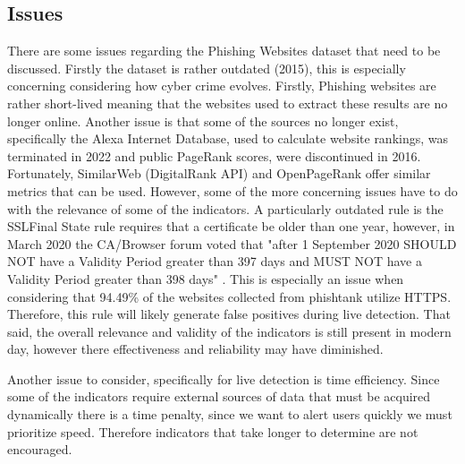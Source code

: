 \documentclass{sigkddExp}
\begin{document}
\subsection{Issues}
There are some issues regarding the Phishing Websites dataset that need to be discussed. Firstly the dataset is rather outdated (2015), this is especially concerning considering how cyber crime evolves. Firstly, Phishing websites are rather short-lived meaning that the websites used to extract these results are no longer online. Another issue is that some of the sources no longer exist, specifically the Alexa Internet Database, used to calculate website rankings, was terminated in 2022 and public PageRank scores, were discontinued in 2016. Fortunately, SimilarWeb (DigitalRank API) and OpenPageRank offer similar metrics that can be used. However, some of the more concerning issues have to do with the relevance of some of the indicators. A particularly outdated rule is the SSLFinal State rule requires that a certificate be older than one year, however, in March 2020 the CA/Browser forum voted that "after 1 September 2020 SHOULD NOT have a Validity Period greater than 397 days and MUST NOT have a Validity Period greater than 398 days" \cite{cabforum2020}. This is especially an issue when considering that 94.49\% of the websites collected from phishtank utilize HTTPS. Therefore, this rule will likely generate false positives during live detection. That said, the overall relevance and validity of the indicators is still present in modern day, however there effectiveness and reliability may have diminished.

\vspace{1em}

Another issue to consider, specifically for live detection is time efficiency. Since some of the indicators require external sources of data that must be acquired dynamically there is a time penalty, since we want to alert users quickly we must prioritize speed. Therefore indicators that take longer to determine are not encouraged.
\end{document}
